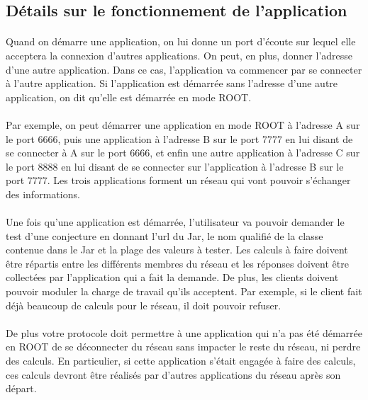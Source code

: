 \documentclass[a4paper,titlepage]{report}
\begin{document}
\subsection{Détails sur le fonctionnement de l'application}
\paragraph{}
Quand on démarre une application, on lui donne un port d'écoute sur lequel elle acceptera la connexion d'autres applications. On peut, en plus, donner l'adresse d'une autre application. Dans ce cas, l'application va commencer par se connecter à l'autre application. Si l'application est démarrée sans l'adresse d'une autre application, on dit qu'elle est démarrée en mode ROOT.
\paragraph{}
Par exemple, on peut démarrer une application en mode ROOT à l’adresse A sur le port 6666, puis une application à l'adresse B sur le port 7777 en lui disant de se connecter à A sur le port 6666, et enfin une autre application à l'adresse C sur le port 8888 en lui disant de se connecter sur l'application à l'adresse B sur le port 7777.
Les trois applications forment un réseau qui vont pouvoir s'échanger des informations.
\paragraph{}
Une fois qu'une application est démarrée, l'utilisateur va pouvoir demander le test d'une conjecture en donnant l'url du Jar, le nom qualifié de la classe contenue dans le Jar et la plage des valeurs à tester. Les calculs à faire doivent être répartis entre les différents membres du réseau et les réponses doivent être collectées par l'application qui a fait la demande. De plus, les clients doivent pouvoir moduler la charge de travail qu'ils acceptent. Par exemple, si le client fait déjà beaucoup de calculs pour le réseau, il doit pouvoir refuser.
\paragraph{}
De plus votre protocole doit permettre à une application qui n'a pas été démarrée en ROOT de se déconnecter du réseau sans impacter le reste du réseau, ni perdre des calculs. En particulier, si cette application s'était engagée à faire des calculs, ces calculs devront être réalisés par d'autres applications du réseau après son départ.
\end{document}
